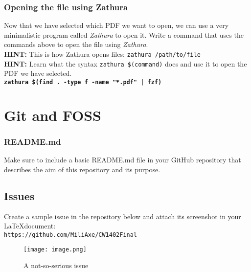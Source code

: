 \documentclass[titlepage, 12pt]{article}
\newcommand{\code}{\texttt}
\begin{document}
	\subsubsection{Opening the file using Zathura}
	Now that we have selected which PDF we want to open, we can use a very minimalistic program called \textit{Zathura} to open it. Write a command that uses the commands above to open the file using \textit{Zathura}.
	\\
	\textbf{HINT:} This is how Zathura opens files: \code{zathura /path/to/file}
	\\
	\textbf{HINT:} Learn what the syntax \code{zathura \$(command)} does and use it to open the PDF we have selected.
	\\
	\textbf{\code{zathura \$(find . -type f -name "*.pdf" | fzf)}}
	
	\section{Git and FOSS}
	
	\subsubsection{README.md}
	Make sure to include a basic README.md file in your GitHub repository that describes the aim of this repository and its purpose.
	
	\subsection{Issues}
	Create a sample issue in the repository below and attach its screenshot in your \LaTeX document:
	\\
	\code{https://github.com/MiliAxe/CW1402Final}
	\\
	\begin{figure}[h]
		\centering
		\texttt{[image: image.png]}
		\caption{A not-so-serious issue}
	\end{figure}
\end{document}
